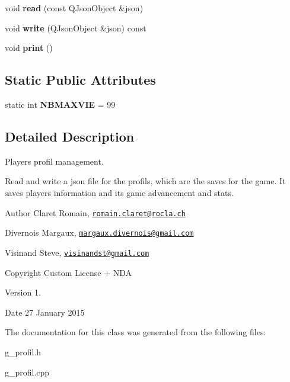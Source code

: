 \begin{DoxyCompactItemize}
\item 
\hypertarget{class_g___profil_ab7b2ac7efaf060381e7bcd180d15b720}{}void {\bfseries read} (const Q\+Json\+Object \&json)\label{class_g___profil_ab7b2ac7efaf060381e7bcd180d15b720}

\item 
\hypertarget{class_g___profil_ac17e86caabd7f5b40eebfba8ff4feec1}{}void {\bfseries write} (Q\+Json\+Object \&json) const \label{class_g___profil_ac17e86caabd7f5b40eebfba8ff4feec1}

\item 
\hypertarget{class_g___profil_a0778c704788ea89c8f5383d58c85611b}{}void {\bfseries print} ()\label{class_g___profil_a0778c704788ea89c8f5383d58c85611b}

\end{DoxyCompactItemize}
\subsection*{Static Public Attributes}
\begin{DoxyCompactItemize}
\item 
\hypertarget{class_g___profil_a7217587c918fc67887f48b8902b3eb70}{}static int {\bfseries N\+B\+M\+A\+X\+V\+I\+E} = 99\label{class_g___profil_a7217587c918fc67887f48b8902b3eb70}

\end{DoxyCompactItemize}


\subsection{Detailed Description}
Player\textquotesingle{}s profil management. 

Read and write a json file for the profils, which are the saves for the game. It saves player\textquotesingle{}s information and its game advancement and stats. \begin{DoxyAuthor}{Author}
Claret Romain, \href{mailto:romain.claret@rocla.ch}{\tt romain.\+claret@rocla.\+ch} 

Divernois Margaux, \href{mailto:margaux.divernois@gmail.com}{\tt margaux.\+divernois@gmail.\+com} 

Visinand Steve, \href{mailto:visinandst@gmail.com}{\tt visinandst@gmail.\+com} 
\end{DoxyAuthor}
\begin{DoxyCopyright}{Copyright}
Custom License + N\+D\+A 
\end{DoxyCopyright}
\begin{DoxyVersion}{Version}
1. 
\end{DoxyVersion}
\begin{DoxyDate}{Date}
27 January 2015 
\end{DoxyDate}


The documentation for this class was generated from the following files\+:\begin{DoxyCompactItemize}
\item 
g\+\_\+profil.\+h\item 
g\+\_\+profil.\+cpp\end{DoxyCompactItemize}
